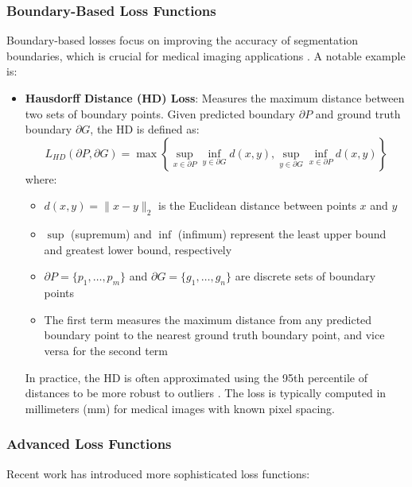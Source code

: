 \documentclass[review]{elsarticle}
\begin{document}
\subsubsection{Boundary-Based Loss Functions}
Boundary-based losses focus on improving the accuracy of segmentation boundaries, which is crucial for medical imaging applications \cite{kervadec2019boundary}. A notable example is:

\begin{itemize}
    \item \textbf{Hausdorff Distance (HD) Loss}: Measures the maximum distance between two sets of boundary points. Given predicted boundary $\partial P$ and ground truth boundary $\partial G$, the HD is defined as:
    \begin{equation}\label{hd-loss}
        L_{HD}(\partial P, \partial G) = \max\left\{ \sup_{x \in \partial P} \inf_{y \in \partial G} d(x,y), \sup_{y \in \partial G} \inf_{x \in \partial P} d(x,y) \right\}
    \end{equation}
    where:
    \begin{itemize}
        \item $d(x,y) = \|x - y\|_2$ is the Euclidean distance between points $x$ and $y$
        \item $\sup$ (supremum) and $\inf$ (infimum) represent the least upper bound and greatest lower bound, respectively
        \item $\partial P = \{p_1, \dots, p_m\}$ and $\partial G = \{g_1, \dots, g_n\}$ are discrete sets of boundary points
        \item The first term measures the maximum distance from any predicted boundary point to the nearest ground truth boundary point, and vice versa for the second term
    \end{itemize}
    In practice, the HD is often approximated using the 95th percentile of distances to be more robust to outliers \cite{karimi2019reducing}. The loss is typically computed in millimeters (mm) for medical images with known pixel spacing.
\end{itemize}

\subsubsection{Advanced Loss Functions}
Recent work has introduced more sophisticated loss functions:
\end{document}
